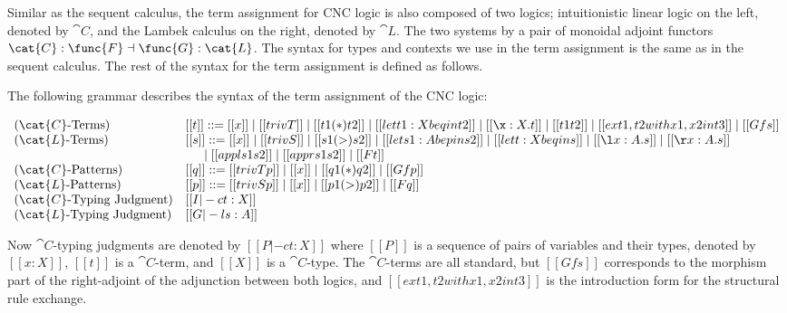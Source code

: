 Similar as the sequent calculus, the term assignment for CNC logic is also
composed of two logics; intuitionistic linear logic on the left, denoted by
$\cat{C}$, and the Lambek calculus on the right, denoted by $\cat{L}$. The
two systems by a pair of monoidal adjoint functors
$\cat{C}:\func{F} \dashv \func{G}:\cat{L}$. The syntax for types and
contexts we use in the term assignment is the same as in the sequent
calculus. The rest of the syntax for the term assignment is defined as
follows.
\begin{definition}
  \label{def:Lambek-syntax}
  The following grammar describes the syntax of the term assignment of the
  CNC logic:
  \begin{center}\vspace{-3px}\small
    \begin{math}
      \begin{array}{lll}        
        \text{($\cat{C}$-Terms)} & [[t]] ::= [[x]] \mid [[trivT]] \mid [[t1 (*) t2]] \mid [[let t1 : X be q in t2]] \mid [[\x:X.t]] \mid [[t1 t2]] \mid [[ex t1 , t2 with x1 , x2 in t3]] \mid [[Gf s]]\\
        \text{($\cat{L}$-Terms)} & [[s]] ::= [[x]] \mid [[trivS]] \mid [[s1 (>) s2]] \mid [[let s1 : A be p in s2]] \mid [[let t : X be q in s]] \mid [[\l x : A.s]] \mid [[\r x : A . s]] \\
        & \,\,\,\,\,\,\,\,\,\mid [[appl s1 s2]] \mid [[appr s1 s2]] \mid [[F t]]\\        
        \text{($\cat{C}$-Patterns)} & [[q]] ::= [[trivTp]] \mid [[x]] \mid [[q1 (*) q2]] \mid [[Gf p]]\\
        \text{($\cat{L}$-Patterns)} & [[p]] ::= [[trivSp]] \mid [[x]] \mid [[p1 (>) p2]] \mid [[F q]]\\        
        \text{($\cat{C}$-Typing Judgment)} & [[I |-c t : X]]\\
        \text{($\cat{L}$-Typing Judgment)} & [[G |-l s : A]]\\
      \end{array}
    \end{math}
  \end{center}
\end{definition}

Now $\cat{C}$-typing judgments are denoted by $[[P |-c t : X]]$ where
$[[P]]$ is a sequence of pairs of variables and their types, denoted by
$[[x : X]]$, $[[t]]$ is a $\cat{C}$-term, and $[[X]]$ is a $\cat{C}$-type.  
The $\cat{C}$-terms are all standard, but $[[Gf s]]$ corresponds to the
morphism part of the right-adjoint of the adjunction between both logics,
and $[[ex t1 , t2 with x1 , x2 in t3]]$ is the introduction form for the
structural rule exchange.

